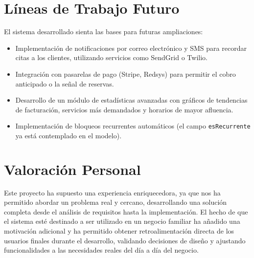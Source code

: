 \section{L\'ineas de Trabajo Futuro}\label{sec:trabajo-futuro}

El sistema desarrollado sienta las bases para futuras ampliaciones:

\begin{itemize}
    \item Implementaci\'on de notificaciones por correo electr\'onico y SMS para recordar citas a los clientes, utilizando servicios como SendGrid o Twilio.
    \item Integraci\'on con pasarelas de pago (Stripe, Redsys) para permitir el cobro anticipado o la se\~nal de reservas.
    \item Desarrollo de un m\'odulo de estad\'isticas avanzadas con gr\'aficos de tendencias de facturaci\'on, servicios m\'as demandados y horarios de mayor afluencia.
    \item Implementaci\'on de bloqueos recurrentes autom\'aticos (el campo \texttt{esRecurrente} ya est\'a contemplado en el modelo).
\end{itemize}

\section{Valoraci\'on Personal}\label{sec:valoracion}

Este proyecto ha supuesto una experiencia enriquecedora, ya que nos ha permitido abordar un problema real y cercano, desarrollando una soluci\'on completa desde el an\'alisis de requisitos hasta la implementaci\'on. El hecho de que el sistema est\'e destinado a ser utilizado en un negocio familiar ha a\~nadido una motivaci\'on adicional y ha permitido obtener retroalimentaci\'on directa de los usuarios finales durante el desarrollo, validando decisiones de dise\~no y ajustando funcionalidades a las necesidades reales del d\'ia a d\'ia del negocio.


